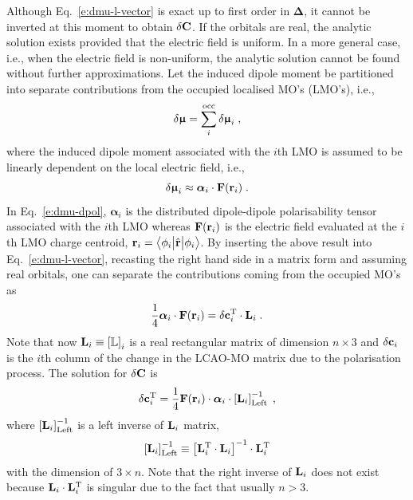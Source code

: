 \documentclass[aip,amsmath,amssymb,reprint,floatfix]{revtex4-1}
\newcommand{\tbraket}[3]{\ensuremath{\bigl\langle {#1} \bigl\lvert {#2} \bigl\lvert {#3} \bigr\rangle}}
\newcommand{\BM}[1]{\bm{#1}}
\begin{document}
Although Eq.~\eqref{e:dmu-l-vector}
is exact up to first order in ${\BM\Delta}$, it cannot be inverted at this moment to obtain $\delta {\bf C}$.
If the orbitals are real, the analytic solution exists
provided that the electric field is uniform. In a more general case, i.e., when the electric field
is non\hyp{}uniform, the analytic solution cannot be found without further approximations.
Let the induced dipole moment be partitioned into separate contributions
from the occupied localised MO's (LMO's), i.e.,
%
\begin{equation} \label{e:dmu-part}
 \delta {\BM{\upmu}} = \sum_i^{\rm occ} \delta {\BM{\upmu}}_i \;,
\end{equation}
%
where the induced dipole moment associated with the $i$th LMO
is assumed to be linearly dependent on the local electric field, i.e.,
%
\begin{equation} \label{e:dmu-dpol}
 \delta {\BM{\upmu}}_i \approx {\BM{\alpha}}_i \cdot {\bf F}({\bf r}_i) \;.
\end{equation}
%
In Eq.~\eqref{e:dmu-dpol}, ${\BM{\alpha}}_i$ is the distributed dipole\hyp{}dipole polarisability tensor
associated with the $i$th LMO whereas ${\bf F}({\bf r}_i)$ 
is the electric field evaluated at the $i$th LMO charge centroid,
${\bf r}_i = \tbraket{\phi_i}{\hat{\bf r}}{\phi_i}$.
By inserting the above result into Eq.~\eqref{e:dmu-l-vector},
recasting the right hand side in a matrix form
and assuming real orbitals,
one can separate the contributions coming from the occupied MO's as
%
\begin{equation} \label{e:dmu-l-vector-mo-transform-X}
 \frac{1}{4} {\BM{\alpha}}_i \cdot {\bf F}({\bf r}_i) 
   =
   \delta {\bf c}_i^{\rm T} \cdot {\bf L}_i \;.
\end{equation}
%
Note that now ${\bf L}_i \equiv \left[ \mathbb{L} \right]_i$ 
is a real rectangular matrix of dimension $n \times 3$ and $\delta{\bf c}_i$ is the $i$th column of the
change in the LCAO-MO matrix due to the polarisation process.
The solution for $\delta {\bf C}$ is
%
\begin{equation} \label{e:mu-ind.matrix.linear.solution}
  \delta {\bf c}_i^{\rm T} = \frac{1}{4}
            {\bf F}({\bf r}_i)  \cdot {\BM{\alpha}}_i \cdot 
                    \left[ {\bf L}_i  \right]^{-1}_{\rm Left} \;,
\end{equation}
%
where $\left[ {\bf L}_i  \right]^{-1}_{\rm Left}$ is a left inverse
of ${\bf L}_i$ matrix,
%
\begin{equation} 
      \left[ {\bf L}_i  \right]^{-1}_{\rm Left}   \equiv
       \left[ {\bf L}_i^{\rm T} \cdot {\bf L}_i \right]^{-1} \cdot {\bf L}_i^{\rm T}   
\end{equation}
%
with the dimension of $3\times n$. Note that the right inverse of ${\bf L}_i$
does not exist because ${\bf L}_i \cdot {\bf L}_i^{\rm T}$ is singular due to the fact that usually
$n > 3$.
\end{document}
